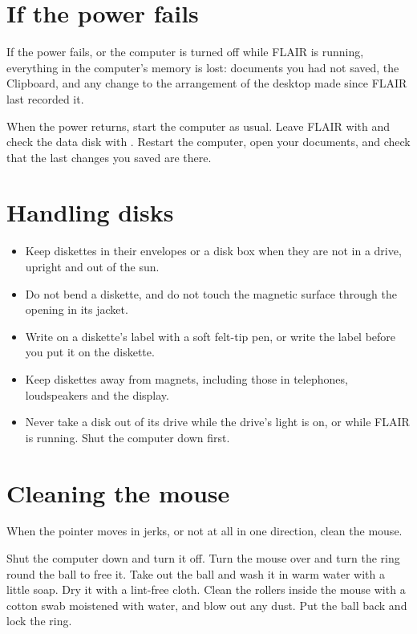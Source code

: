 \section{If the power fails}
If the power fails, or the computer is turned off while FLAIR is running,
everything in the computer's memory is lost: documents you had not saved,
the Clipboard, and any change to the arrangement of the desktop made since
FLAIR last recorded it.
\begin{TaskSteps}
\Step When the power returns, start the computer as usual.
\Step Leave FLAIR with  and check the data disk
with .
\Step Restart the computer, open your documents, and check that the last
changes you saved are there.
\end{TaskSteps}

\section{Handling disks}
\begin{itemize}
\item Keep diskettes in their envelopes or a disk box when they are not in
  a drive, upright and out of the sun.
\item Do not bend a diskette, and do not touch the magnetic surface
  through the opening in its jacket.
\item Write on a diskette's label with a soft felt-tip pen, or write the
  label before you put it on the diskette.
\item Keep diskettes away from magnets, including those in telephones,
  loudspeakers and the display.
\item Never take a disk out of its drive while the drive's light is on, or
  while FLAIR is running.  Shut the computer down first.
\end{itemize}

\section{Cleaning the mouse}
When the pointer moves in jerks, or not at all in one direction, clean the
mouse.
\begin{TaskSteps}
\Step Shut the computer down and turn it off.
\Step Turn the mouse over and turn the ring round the ball to free it.
\Step Take out the ball and wash it in warm water with a little soap.  Dry
it with a lint-free cloth.
\Step Clean the rollers inside the mouse with a cotton swab moistened with
water, and blow out any dust.
\Step Put the ball back and lock the ring.
\end{TaskSteps}

